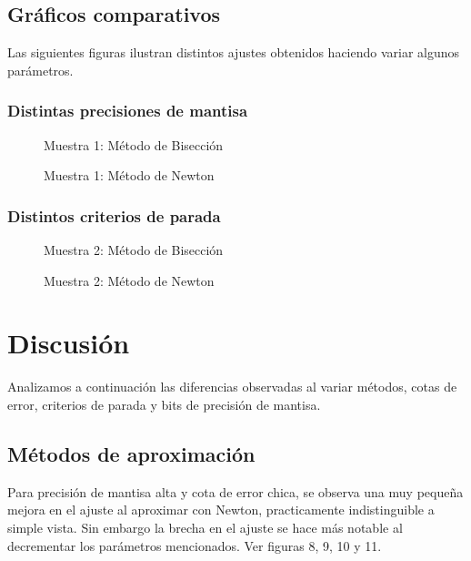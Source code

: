 \documentclass[a4paper,10pt,twoside]{article}
\newcommand{\grafico}[2]{
	\begin{figure}[H]
		\caption{#2}
		\centering
		
	\end{figure}
}
\begin{document}

\subsection{Gráficos comparativos}
Las siguientes figuras ilustran distintos ajustes obtenidos haciendo variar algunos parámetros.

\subsubsection{Distintas precisiones de mantisa}

\grafico{biseccion-mantisas.tex}{Muestra 1: Método de Bisección}
\grafico{newton-mantisas.tex}{Muestra 1: Método de Newton}
             
\subsubsection{Distintos criterios de parada}

\grafico{biseccion-criterios-parada.tex}{Muestra 2: Método de Bisección}
\grafico{newton-criterios-parada.tex}{Muestra 2: Método de Newton}




\section{Discusión}

Analizamos a continuación las diferencias observadas al variar métodos, cotas
de error, criterios de parada y bits de precisión de mantisa.


\subsection{Métodos de aproximación}
Para precisión de mantisa alta y cota de error chica, se observa una muy pequeña
mejora en el ajuste al aproximar con Newton, practicamente indistinguible a simple
vista. Sin embargo la brecha en el ajuste se hace más notable al decrementar
los parámetros mencionados. Ver figuras 8, 9, 10 y 11.
\end{document}
